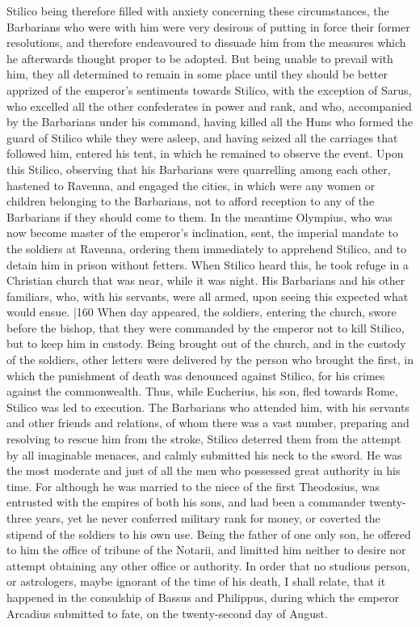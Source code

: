 Stilico being therefore filled with anxiety concerning these circumstances, the Barbarians who were with him were very desirous of putting in force their former resolutions, and therefore endeavoured to dissuade him from the measures which he afterwards thought proper to be adopted. But being unable to prevail with him, they all determined to remain in some place until they should be better apprized of the emperor's sentiments towards Stilico, with the exception of Sarus, who excelled all the other confederates in power and rank, and who, accompanied by the Barbarians under his command, having killed all the Huns who formed the guard of Stilico while they were asleep, and having seized all the carriages that followed him, entered his tent, in which he remained to observe the event. Upon this Stilico, observing that his Barbarians were quarrelling among each other, hastened to Ravenna, and engaged the cities, in which were any women or children belonging to the Barbarians, not to afford reception to any of the Barbarians if they should come to them. In the meantime Olympius, who was now become master of the emperor's inclination, sent, the imperial mandate to the soldiers at Ravenna, ordering them immediately to apprehend Stilico, and to detain him in prison without fetters. When Stilico heard this, he took refuge in a Christian church that was near, while it was night. His Barbarians and his other familiars, who, with his servants, were all armed, upon seeing this expected what would ensue.
|160 When day appeared, the soldiers, entering the church, swore before the bishop, that they were commanded by the emperor not to kill Stilico, but to keep him in custody. Being brought out of the church, and in the custody of the soldiers, other letters were delivered by the person who brought the first, in which the punishment of death was denounced against Stilico, for his crimes against the commonwealth. Thus, while Eucherius, his son, fled towards Rome, Stilico was led to execution. The Barbarians who attended him, with his servants and other friends and relations, of whom there was a vast number, preparing and resolving to rescue him from the stroke, Stilico deterred them from the attempt by all imaginable menaces, and calmly submitted his neck to the sword. He was the most moderate and just of all the men who possessed great authority in his time. For although he was married to the niece of the first Theodosius, was entrusted with the empires of both his sons, and had been a commander twenty-three years, yet he never conferred military rank for money, or coverted the stipend of the soldiers to his own use. Being the father of one only son, he offered to him the office of tribune of the Notarii, and limitted him neither to desire nor attempt obtaining any other office or authority. In order that no studious person, or astrologers, maybe ignorant of the time of his death, I shall relate, that it happened in the consulship of Bassus and Philippus, during which the emperor Arcadius submitted to fate, on the twenty-second day of August.

